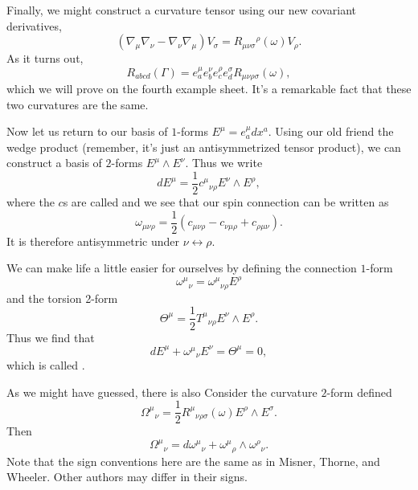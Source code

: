 Finally, we might construct a curvature tensor using our new covariant derivatives,
$$(\nabla_\mu \nabla_\nu - \nabla_\nu \nabla_\mu)V_\sigma = R_{\mu\nu\sigma}{}^\rho(\omega)V_\rho.$$
As it turns out,
$$R_{abcd}(\Gamma)=e^\mu_a e^\nu_b e^\rho_c e^\sigma_d R_{\mu\nu\rho\sigma}(\omega),$$
which we will prove on the fourth example sheet. It's a remarkable fact that these two curvatures are the same.

Now let us return to our basis of $1$-forms $E^\mu=e^\mu_a dx^a$. Using our old friend the wedge product (remember, it's just an antisymmetrized tensor product), we can construct a basis of $2$-forms $E^\mu \wedge E^\nu$. Thus we write
$$dE^\mu=\frac{1}{2} c^\mu{}_{\nu\rho} E^\nu \wedge E^\rho,$$
where the $c$s are called  and we see that our spin connection can be written as
$$\omega_{\mu\nu\rho}=\frac{1}{2}(c_{\mu\nu\rho}-c_{\nu\mu\rho}+c_{\rho\mu\nu}).$$
It is therefore antisymmetric under $\nu\leftrightarrow \rho$.

We can make life a little easier for ourselves by defining the connection $1$-form
$$\omega^\mu{}_\nu = \omega^\mu{}_{\nu\rho}E^\rho$$
and the torsion 2-form
$$\Theta^\mu =\frac{1}{2} T^\mu{}_{\nu\rho} E^\nu \wedge E^\rho.$$
Thus we find that
$$dE^\mu+\omega^\mu{}_\nu E^\nu = \Theta^\mu=0,$$
which is called .

As we might have guessed, there is also  Consider the curvature $2$-form defined
$$\Omega^\mu{}_\nu = \frac{1}{2}R^\mu{}_{\nu\rho\sigma}(\omega) E^\rho \wedge E^\sigma.$$
Then
$$\Omega^\mu{}_\nu = d\omega^\mu{}_\nu +\omega^\mu{}_{\rho }\wedge \omega^\rho{}_\nu.$$
Note that the sign conventions here are the same as in Misner, Thorne, and Wheeler. Other authors may differ in their signs.

